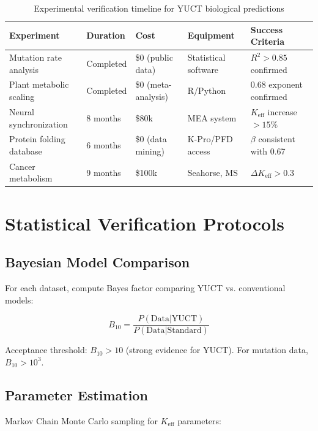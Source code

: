 \documentclass[11pt]{article}
\begin{document}
	\begin{table}[h]
		\centering
		\caption{Experimental verification timeline for YUCT biological predictions}
		\begin{tabular}{@{}lllll@{}}
			\toprule
			\textbf{Experiment} & \textbf{Duration} & \textbf{Cost} & \textbf{Equipment} & \textbf{Success Criteria} \\
			\midrule
			Mutation rate analysis & Completed & \$0 (public data) & Statistical software & \(R^2 > 0.85\) confirmed \\
			Plant metabolic scaling & Completed & \$0 (meta-analysis) & R/Python & 0.68 exponent confirmed \\
			Neural synchronization & 8 months & \$80k & MEA system & \(K_{\text{eff}}\) increase \(>15\%\) \\
			Protein folding database & 6 months & \$0 (data mining) & K-Pro/PFD access & \(\beta\) consistent with 0.67 \\
			Cancer metabolism & 9 months & \$100k & Seahorse, MS & \(\Delta K_{\text{eff}} > 0.3\) \\
			\bottomrule
		\end{tabular}
		\label{tab:timeline}
	\end{table}
	
	\section{Statistical Verification Protocols}
	
	\subsection{Bayesian Model Comparison}
	
	For each dataset, compute Bayes factor comparing YUCT vs. conventional models:
	
	\begin{equation}
		B_{10} = \frac{P(\text{Data}|\text{YUCT})}{P(\text{Data}|\text{Standard})}
	\end{equation}
	
	Acceptance threshold: \(B_{10} > 10\) (strong evidence for YUCT). For mutation data, \(B_{10} > 10^3\).
	
	\subsection{Parameter Estimation}
	
	Markov Chain Monte Carlo sampling for \(K_{\text{eff}}\) parameters:
	
\end{document}

